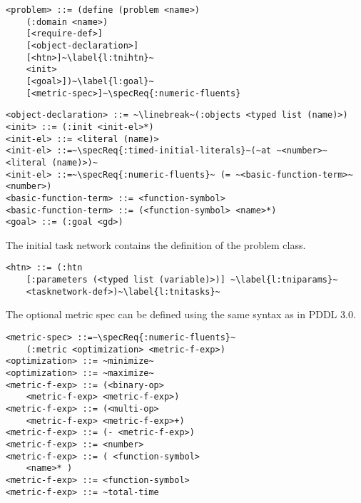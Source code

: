 \documentclass[letterpaper]{article} %
\begin{document}
\begin{lstlisting}[firstnumber=last, escapechar=~]
<problem> ::= (define (problem <name>)
    (:domain <name>)
    [<require-def>]
    [<object-declaration>]
    [<htn>]~\label{l:tnihtn}~
    <init>
    [<goal>])~\label{l:goal}~
    [<metric-spec>]~\specReq{:numeric-fluents}
\end{lstlisting}

\begin{lstlisting}[firstnumber=last, escapechar=~]
<object-declaration> ::= ~\linebreak~(:objects <typed list (name)>)
<init> ::= (:init <init-el>*)
<init-el> ::= <literal (name)>
<init-el> ::=~\specReq{:timed-initial-literals}~(~at ~<number>~ <literal (name)>)~
<init-el> ::=~\specReq{:numeric-fluents}~ (= ~<basic-function-term>~ <number>)
<basic-function-term> ::= <function-symbol>
<basic-function-term> ::= (<function-symbol> <name>*)
<goal> ::= (:goal <gd>)
\end{lstlisting}

The initial task network contains the definition of the problem class.

\begin{lstlisting}[firstnumber=last, escapechar=~]
<htn> ::= (:htn
    [:parameters (<typed list (variable)>)] ~\label{l:tniparams}~
    <tasknetwork-def>)~\label{l:tnitasks}~
\end{lstlisting} %

%
%

The optional metric spec can be defined using the same syntax as in PDDL 3.0.

\begin{lstlisting}[firstnumber=last, escapechar=~]
<metric-spec> ::=~\specReq{:numeric-fluents}~
    (:metric <optimization> <metric-f-exp>)
<optimization> ::= ~minimize~
<optimization> ::= ~maximize~
<metric-f-exp> ::= (<binary-op>
    <metric-f-exp> <metric-f-exp>)
<metric-f-exp> ::= (<multi-op>
    <metric-f-exp> <metric-f-exp>+)
<metric-f-exp> ::= (- <metric-f-exp>)
<metric-f-exp> ::= <number>
<metric-f-exp> ::= ( <function-symbol>
    <name>* )
<metric-f-exp> ::= <function-symbol>
<metric-f-exp> ::= ~total-time
\end{lstlisting}
\end{document}
